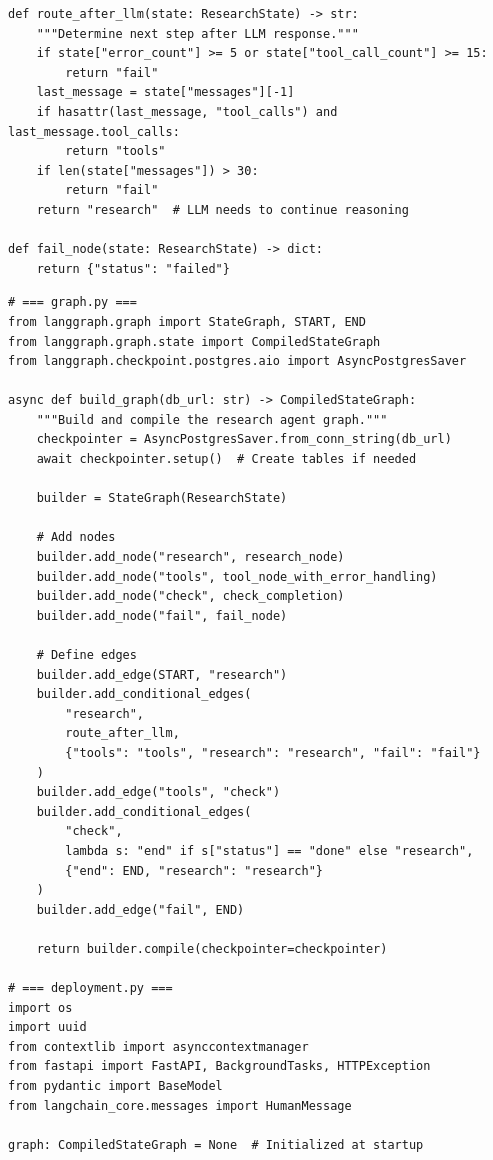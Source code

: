 \begin{lstlisting}[style=pythonstyle, caption={Complete production research agent: state and nodes}]
def route_after_llm(state: ResearchState) -> str:
    """Determine next step after LLM response."""
    if state["error_count"] >= 5 or state["tool_call_count"] >= 15:
        return "fail"
    last_message = state["messages"][-1]
    if hasattr(last_message, "tool_calls") and last_message.tool_calls:
        return "tools"
    if len(state["messages"]) > 30:
        return "fail"
    return "research"  # LLM needs to continue reasoning

def fail_node(state: ResearchState) -> dict:
    return {"status": "failed"}
\end{lstlisting}

\begin{lstlisting}[style=pythonstyle, caption={Complete production research agent: graph and deployment}]
# === graph.py ===
from langgraph.graph import StateGraph, START, END
from langgraph.graph.state import CompiledStateGraph
from langgraph.checkpoint.postgres.aio import AsyncPostgresSaver

async def build_graph(db_url: str) -> CompiledStateGraph:
    """Build and compile the research agent graph."""
    checkpointer = AsyncPostgresSaver.from_conn_string(db_url)
    await checkpointer.setup()  # Create tables if needed

    builder = StateGraph(ResearchState)

    # Add nodes
    builder.add_node("research", research_node)
    builder.add_node("tools", tool_node_with_error_handling)
    builder.add_node("check", check_completion)
    builder.add_node("fail", fail_node)

    # Define edges
    builder.add_edge(START, "research")
    builder.add_conditional_edges(
        "research",
        route_after_llm,
        {"tools": "tools", "research": "research", "fail": "fail"}
    )
    builder.add_edge("tools", "check")
    builder.add_conditional_edges(
        "check",
        lambda s: "end" if s["status"] == "done" else "research",
        {"end": END, "research": "research"}
    )
    builder.add_edge("fail", END)

    return builder.compile(checkpointer=checkpointer)

# === deployment.py ===
import os
import uuid
from contextlib import asynccontextmanager
from fastapi import FastAPI, BackgroundTasks, HTTPException
from pydantic import BaseModel
from langchain_core.messages import HumanMessage

graph: CompiledStateGraph = None  # Initialized at startup


\end{lstlisting}
